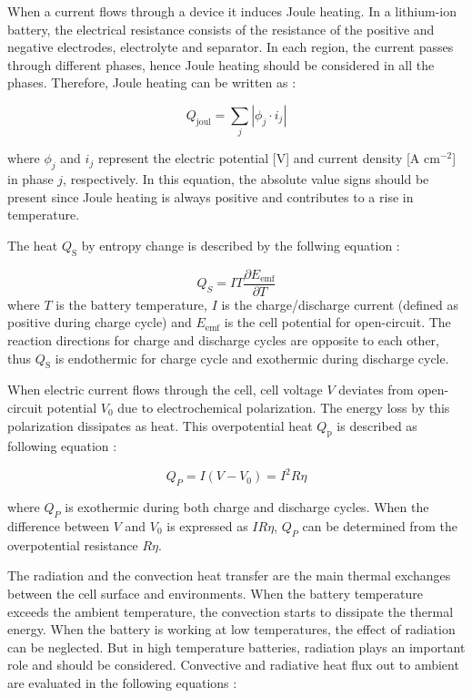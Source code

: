 When a current flows through a device it induces Joule heating. In a lithium-ion battery, the electrical resistance consists of the resistance of the positive and negative electrodes, electrolyte and separator. In each region, the current passes through different phases, hence Joule heating should be considered in all the phases. Therefore, Joule heating can be written as \cite{torabi2011study}:

\begin{equation}
    \label{eq:joule-heating}
    Q_{\text{joul}}=\sum_j\left|\phi_j \cdot i_j\right|
\end{equation}

where $\phi_j$ and $i_j$ represent the electric potential [V] and current density [A cm$^{-2}$] in phase $j$, respectively. In this equation, the absolute value signs should be present since Joule heating is always positive and contributes to a rise in temperature.

The heat $Q_{\mathrm{S}}$ by entropy change is described by the follwing equation \cite{onda2006thermal}:

\begin{equation}
    \label{eq:entropy-change}
    Q_S=I T \frac{\partial E_{\mathrm{emf}}}{\partial T}
\end{equation}
where $T$ is the battery temperature, $I$ is the charge/discharge current (defined as positive during charge cycle) and $E_{\mathrm{emf}}$ is the cell potential for open-circuit. The reaction directions for charge and discharge cycles are opposite to each other, thus $Q_{\mathrm{S}}$ is endothermic for charge cycle and exothermic during discharge cycle.

When electric current flows through the cell, cell voltage $V$ deviates from open-circuit potential $V_0$ due to electrochemical polarization. The energy loss by this polarization dissipates as heat. This overpotential heat $Q_{\mathrm{p}}$ is described as following equation \cite{onda2006thermal}:

\begin{equation}
    \label{eq:overpotential-heat}
    Q_P=I\left(V-V_0\right)=I^2 R \eta
\end{equation}

where $Q_P$ is exothermic during both charge and discharge cycles. When the difference between $V$ and $V_0$ is expressed as $IR \eta$, $Q_P$ can be determined from the overpotential resistance $R \eta$.

The radiation and the convection heat transfer are the main thermal exchanges between the cell surface and environments. When the battery temperature exceeds the ambient temperature, the convection starts to dissipate the thermal energy. When the battery is working at low temperatures, the effect of radiation can be neglected. But in high temperature batteries, radiation plays an important role and should be considered. Convective and radiative heat flux out to ambient are evaluated in the following equations \cite{torabi2011study}:

